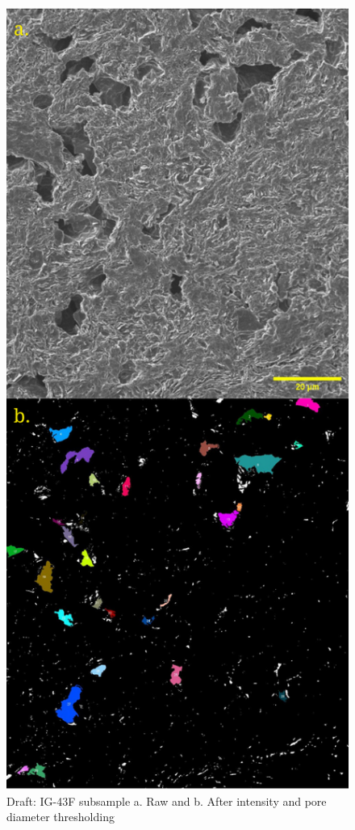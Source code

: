 \documentclass[review]{elsarticle}
\begin{document}
\begin{figure}[!htbp]
    \centering
    \includegraphics[width=0.9\columnwidth]{./Media/C1-ig430f fused cropped 8 bit one color threshed subsample 2um areathresh}
    \caption{Draft: IG-43F subsample a. Raw and b. After intensity and pore diameter thresholding}
    \label{fig:C1-ig430f fused cropped 8 bit one color threshed subsample 2um areathresh}
\end{figure}
\end{document}
